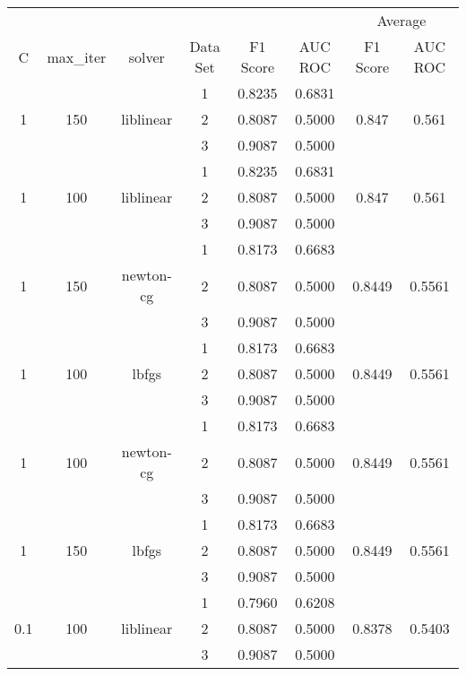 \documentclass[12pt, twoside]{article}
\begin{document}
\begin{landscape}
\begin{table}[!htbp]
  \centering
  \begin{tabular}{cccccccc}
  \toprule
  {}	&	{}	&	{}	&	{}	&	{}	&	{}	&	\multicolumn{2}{c}{Average} \\
  \cmidrule(r){7-8}
  C	&	max\_iter	&	solver	&	Data Set	&	F1 Score	&	AUC ROC	&	F1 Score	&	AUC ROC \\
  \midrule
  	&	&	&	1	&	0.8235	&	0.6831	&		&	 \\
  1	&	150	&	liblinear	&	2	&	0.8087	&	0.5000	&	0.847	&	0.561 \\
  	&	&	&	3	&	0.9087	&	0.5000	&		&	 \\
  	\cmidrule(r){4-8}
  	&	&	&	1	&	0.8235	&	0.6831	&		&	 \\
 1	&	100	&	liblinear	&	2	&	0.8087	&	0.5000	&	0.847	&	0.561 \\
  	&	&	&	3	&	0.9087	&	0.5000	&		&	 \\
  	\cmidrule(r){4-8}
  	&	&	&	1	&	0.8173	&	0.6683	&		&	 \\
  1	&	150	&	newton-cg	&	2	&	0.8087	&	0.5000	&	0.8449	&	0.5561 \\
  	&	&	&	3	&	0.9087	&	0.5000	&		&	 \\
  	\cmidrule(r){4-8}
  	&	&	&	1	&	0.8173	&	0.6683	&		&	 \\
  1	&	100	&	lbfgs	&	2	&	0.8087	&	0.5000	&	0.8449	&	0.5561 \\
  	&	&	&	3	&	0.9087	&	0.5000	&		&	 \\
  	\cmidrule(r){4-8}
  	&	&	&	1	&	0.8173	&	0.6683	&		&	 \\
  1	&	100	&	newton-cg	&	2	&	0.8087	&	0.5000	&	0.8449	&	0.5561 \\
  	&	&	&	3	&	0.9087	&	0.5000	&		&	 \\
  	\cmidrule(r){4-8}
  	&	&	&	1	&	0.8173	&	0.6683	&		&	 \\
  1	&	150	&	lbfgs	&	2	&	0.8087	&	0.5000		&	0.8449	&	0.5561 \\
  	&	&	&	3	&	0.9087	&	0.5000		&		&	 \\
  	\cmidrule(r){4-8}
  	&	&	&	1	&	0.7960	&	0.6208	&		&	 \\
  0.1	&	100	&	liblinear	&	2	&	0.8087	&	0.5000	&	0.8378	&	0.5403 \\
  	&	&	&	3	&	0.9087	&	0.5000	&		&	 \\

\end{tabular}
\end{table}
\end{landscape}
\end{document}
